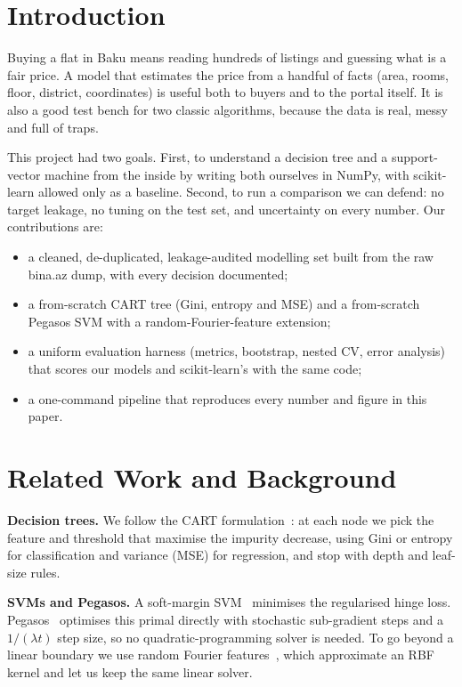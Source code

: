 \documentclass[10pt,twocolumn,a4paper]{article}
\begin{document}
\section{Introduction}
Buying a flat in Baku means reading hundreds of listings and guessing what
is a fair price. A model that estimates the price from a handful of facts
(area, rooms, floor, district, coordinates) is useful both to buyers and
to the portal itself. It is also a good test bench for two classic
algorithms, because the data is real, messy and full of traps.

This project had two goals. First, to understand a decision tree and a
support-vector machine from the inside by writing both ourselves in
NumPy, with scikit-learn allowed only as a baseline. Second, to run a
comparison we can defend: no target leakage, no tuning on the test set, and
uncertainty on every number. Our contributions are:
\begin{itemize}
  \item a cleaned, de-duplicated, leakage-audited modelling set built from
        the raw bina.az dump, with every decision documented;
  \item a from-scratch CART tree (Gini, entropy and MSE) and a from-scratch
        Pegasos SVM with a random-Fourier-feature extension;
  \item a uniform evaluation harness (metrics, bootstrap, nested CV, error
        analysis) that scores our models and scikit-learn's with the same code;
  \item a one-command pipeline that reproduces every number and figure in this
        paper.
\end{itemize}

\section{Related Work and Background}
\textbf{Decision trees.} We follow the CART formulation~\cite{cart}: at each node
we pick the feature and threshold that maximise the impurity decrease, using
Gini or entropy for classification and variance (MSE) for regression, and
stop with depth and leaf-size rules.

\textbf{SVMs and Pegasos.} A soft-margin SVM~\cite{svm} minimises the
regularised hinge loss. Pegasos~\cite{pegasos} optimises this primal
directly with stochastic sub-gradient steps and a $1/(\lambda t)$ step size,
so no quadratic-programming solver is needed. To go beyond a linear boundary
we use random Fourier features~\cite{rff}, which approximate an RBF kernel and
let us keep the same linear solver.
\end{document}
